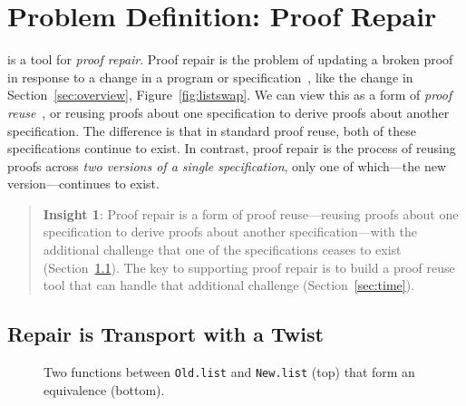 \section{Problem Definition: Proof Repair}
\label{sec:key1}

\toolname is a tool for \textit{proof repair}.
Proof repair is the problem of updating a broken proof in response to a change in a program or specification~\cite{PGL-045, pumpkinpatch},
like the change in Section~\ref{sec:overview}, Figure~\ref{fig:listswap}.
We can view this as a form of 
\textit{proof reuse}~\cite{Ringer2019, felty1994generalization, caplan1995logical, pons2000generalization, johnsen2004theorem}, %
or reusing proofs about one specification to derive proofs about another specification.
The difference is that in standard proof reuse, both of these specifications continue to exist.
In contrast, proof repair is the process of reusing proofs across \textit{two versions of a single specification},
only one of which---the new version---continues to exist.

\begin{quote}
\textbf{Insight 1}:
Proof repair is a form of proof reuse---reusing proofs about one specification to derive proofs about another specification---with 
the additional challenge that one of the specifications ceases to exist (Section~\ref{sec:repair}).
The key to supporting proof repair is to build a proof reuse
tool that can handle that additional challenge (Section~\ref{sec:time}).
\end{quote}

\subsection{Repair is Transport with a Twist}
\label{sec:repair}

\begin{figure}
\vspace{-0.2cm}
\caption{Two functions between \lstinline{Old.list} and \lstinline{New.list} (top) that form an equivalence (bottom).}
\label{fig:equivalence}
\end{figure}

